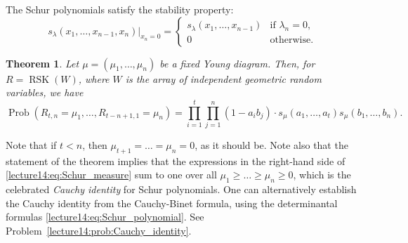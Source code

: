 \documentclass[letterpaper,11pt,oneside,reqno]{book}
\numberwithin{equation}{chapter}  %
\newtheorem{theorem}[proposition]{Theorem}
\theoremstyle{definition}
\begin{document}
The Schur polynomials satisfy the stability property:
\begin{equation}
	\label{lecture14:eq:stability_property_Schur}
	s_\lambda(x_1,\ldots,x_{n-1},x_n)\big\vert_{x_n=0} =
	\begin{cases}
		s_\lambda(x_1,\ldots,x_{n-1}) & \text{if } \lambda_n=0,\\
		0 & \text{otherwise.}
	\end{cases}
\end{equation}

\begin{theorem}
	\label{lecture14:thm:Schur_measure}
	Let $\mu=(\mu_1,\ldots,\mu_n)$ be a fixed Young diagram.
	Then, for $R=\operatorname{RSK}(W)$, where $W$ is the array of independent geometric random variables,
	we have
	\begin{equation}
		\label{lecture14:eq:Schur_measure}
		\operatorname{Prob}\left( R_{t,n}=\mu_1, \ldots, R_{t-n+1,1}=\mu_n \right)
		=
		\prod_{i=1}^t\prod_{j=1}^n
		(1-a_i b_j)\cdot s_\mu(a_1,\ldots,a_t )s_\mu(b_1,\ldots,b_n ).
	\end{equation}
\end{theorem}
Note that if $t<n$, then $\mu_{t+1}=\ldots=\mu_n=0 $, as it should be.
Note also that the statement of the theorem implies that the
expressions in the right-hand side of \eqref{lecture14:eq:Schur_measure}
sum to one over all $\mu_1\ge \ldots\ge \mu_n\ge0 $,
which is the celebrated \emph{Cauchy identity} for Schur polynomials.
One can alternatively establish the Cauchy identity from the
Cauchy-Binet formula, using the determinantal formulas
\eqref{lecture14:eq:Schur_polynomial}. See Problem~\ref{lecture14:prob:Cauchy_identity}.
\end{document}
